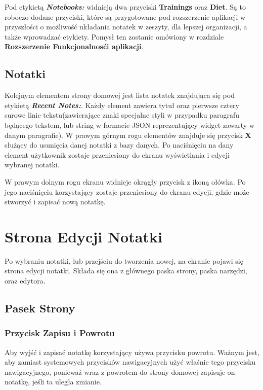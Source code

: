 Pod etykietą \textbf{\textit{Notebooks:}} widnieją dwa przyciski \textbf{Trainings} oraz \textbf{Diet}. Są to roboczo dodane przyciski, które są przygotowane pod rozszerzenie aplikacji w przyszłości o możliwość układania notatek w zeszyty, dla lepszej organizacji, a także wprowadzać etykiety.
Pomysł ten zostanie omówiony w rozdziale \textbf{Rozszerzenie Funkcjonalnosći aplikacji}.

\subsection{Notatki}

Kolejnym elementem strony domowej jest lista notatek znajdująca się pod etykietą \textbf{\textit{Recent Notes:}}. Każdy element zawiera tytuł oraz pierwsze cztery surowe linie tekstu(zawierające znaki specjalne styli w przypadku paragrafu będącego tekstem, lub string w formacie JSON reprezentujący widget zawarty w danym paragrafie).
W prawym górnym rogu elementów znajduje się przycisk \textbf{X} służący do usunięcia danej notatki z bazy danych.
Po naciśnięciu na dany element użytkownik zostaje przeniesiony do ekranu wyświetlania i edycji wybranej notatki.

W prawym dolnym rogu ekranu widnieje okrągły przycisk z ikoną ołówka.
Po jego naciśnięciu korzystający zostaje przeniesiony do ekranu edycji, gdzie może stworzyć i zapisać nową notatkę.

\section{Strona Edycji Notatki}

Po wybraniu notatki, lub przejściu do tworzenia nowej, na ekranie pojawi się strona edycji notatki. Składa się ona z głównego paska strony, paska narzędzi, oraz edytora.
\subsection{Pasek Strony}

\subsubsection{Przycisk Zapisu i Powrotu}

Aby wyjść i zapisać notatkę korzystający używa przycisku powrotu.
Ważnym jest, aby zamiast systemowych przycisków nawigacyjnych użyć właśnie tego przycisku nawigacyjnego, ponieważ wraz z powrotem do strony domowej zapisuje on notatkę, jeśli ta uległa zmianie.

